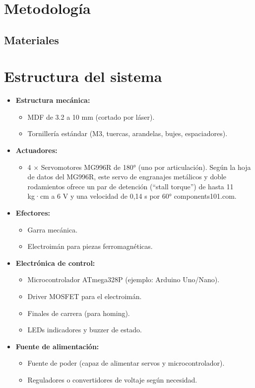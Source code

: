 \section{Metodología}
\subsection{Materiales}
\section*{Estructura del sistema}

\begin{itemize}[leftmargin=1.2cm]
  \item \textbf{Estructura mecánica:}
  \begin{itemize}
    \item MDF de 3.2 a 10 mm (cortado por láser).
    \item Tornillería estándar (M3, tuercas, arandelas, bujes, espaciadores).
  \end{itemize}

  \item \textbf{Actuadores:}
  \begin{itemize}
    \item 4 × Servomotores MG996R de 180° (uno por articulación).
    Según la hoja de datos del MG996R, este servo de engranajes metálicos y doble rodamientos ofrece un par de detención (“stall torque”) de hasta 11 kg·cm a 6 V y una velocidad de 0,14 s por 60° 
components101.com.
  \end{itemize}

  \item \textbf{Efectores:}
  \begin{itemize}
    \item Garra mecánica.
    \item Electroimán para piezas ferromagnéticas.
  \end{itemize}

  \item \textbf{Electrónica de control:}
  \begin{itemize}
    \item Microcontrolador ATmega328P (ejemplo: Arduino Uno/Nano).
    \item Driver MOSFET  para el electroimán.
    \item Finales de carrera (para homing).
    \item LEDs indicadores y buzzer de estado.
  \end{itemize}

  \item \textbf{Fuente de alimentación:}
  \begin{itemize}
    \item Fuente de poder (capaz de alimentar servos y microcontrolador).
    \item Reguladores o convertidores de voltaje según necesidad.
  \end{itemize}
\end{itemize}

